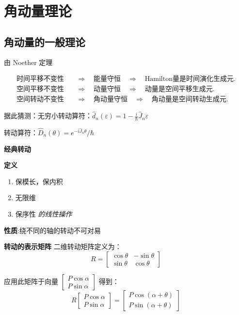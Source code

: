 \documentclass[lang=cn,10pt]{elegantbook}
\begin{document}
\chapter{角动量理论}
\section{角动量的一般理论}
由 Noether 定理

\begin{align*}
	\text{时间平移不变性} &\quad \Longrightarrow \quad \text{能量守恒} \quad \Longrightarrow \quad \text{Hamilton量是时间演化生成元}. \\
	\text{空间平移不变性} &\quad \Longrightarrow \quad \text{动量守恒} \quad \Longrightarrow \quad \text{动量是空间平移生成元}. \\
	\text{空间转动不变性} &\quad \Longrightarrow \quad \text{角动量守恒} \quad \Longrightarrow \quad \text{角动量是空间转动生成元}.
\end{align*}

据此猜测：无穷小转动算符：\(\hat{d}_n(\varepsilon) = 1 - \frac{i}{\hbar} \hat{J}_n \varepsilon\)

转动算符：\(\hat{D}_n(\theta) = e^{-i \hat{J}_n \theta}/\hbar\)


\textbf{经典转动}

\textbf{定义}
\begin{enumerate}
	\item 保模长，保内积
	\item 无限维
	\item 保序性 \quad \textit{的线性操作}
\end{enumerate}

\textbf{性质}:绕不同的轴的转动不可对易

\textbf{转动的表示矩阵}
二维转动矩阵定义为：
\[
R = \begin{bmatrix}
	\cos\theta & -\sin\theta \\
	\sin\theta & \cos\theta
\end{bmatrix}
\]

应用此矩阵于向量 \(\begin{bmatrix} P\cos\alpha \\ P\sin\alpha \end{bmatrix}\) 得到：
\[
R \begin{bmatrix} P\cos\alpha \\ P\sin\alpha \end{bmatrix} = \begin{bmatrix} P\cos(\alpha+\theta) \\ P\sin(\alpha+\theta) \end{bmatrix}
\]
\end{document}
